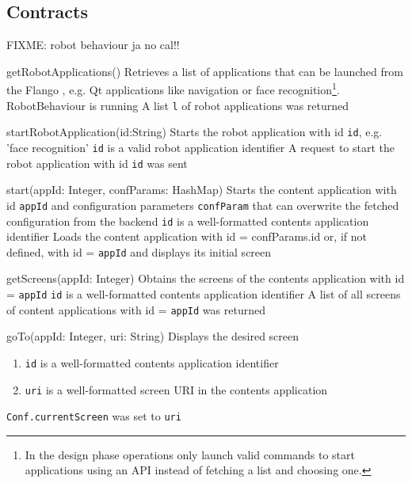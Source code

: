 \subsection{Contracts}

FIXME: robot behaviour ja no cal!!

\begin{sopcontract}{getRobotApplications()}
{Retrieves a list of applications that can be launched from the Flango \cm , e.g. Qt applications like navigation or face recognition\footnote{In the design phase operations only launch valid commands to start applications using an \ac{API} instead of fetching a list and choosing one.}.}
{RobotBehaviour is running}
{A list \texttt{l} of robot applications was returned}
\end{sopcontract}

\begin{sopcontract}{startRobotApplication(id:String)}
{Starts the robot application with id \texttt{id}, e.g. 'face recognition'}
{\texttt{id} is a valid robot application identifier}
{A request to start the robot application with id \texttt{id} was sent}
\end{sopcontract}

\begin{sopcontract}{start(appId: Integer, confParams: HashMap)}
{Starts the content application with id \texttt{appId} and configuration parameters \texttt{confParam} that can overwrite the fetched configuration from the backend}
{\texttt{id} is a well-formatted contents application identifier}
{Loads the content application with id = confParams.id or, if not defined, with id = \texttt{appId} and displays its initial screen}
\end{sopcontract}

\begin{sopcontract}{getScreens(appId: Integer)}
{Obtains the screens of the contents application with id = \texttt{appId}}
{\texttt{id} is a well-formatted contents application identifier}
{A list of all screens of content applications with id = \texttt{appId} was returned}
\end{sopcontract}

\begin{sopcontract}{goTo(appId: Integer, uri: String)}
{Displays the desired screen}
{
\begin{enumerate}
    \item \texttt{id} is a well-formatted contents application identifier 
    \item \texttt{uri} is a well-formatted screen \ac{URI} in the contents application
\end{enumerate}
}
{\texttt{Conf.currentScreen} was set to \texttt{uri}}
\end{sopcontract}

